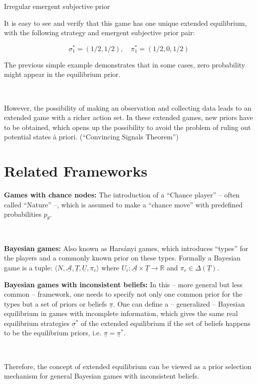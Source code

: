 \documentclass{beamer}
\theoremstyle{definition}
\begin{document}
\begin{frame}{Irregular emergent subjective prior}

    It is easy to see and verify that this game has one unique extended equilibrium, with the following strategy and emergent subjective prior pair:

    \begin{equation}
        \sigma_1^* = (1/2,1/2), \quad \pi_1^* = (1/2, 0, 1/2)
    \end{equation}

    The previous simple example demonstrates that in some cases, zero probability might appear in the equilibrium prior.

    \
    
    However, the possibility of making an observation and collecting data leads to an extended game with a richer action set. In these extended games, new priors have to be obtained, which opens up the possibility to avoid the problem of ruling out potential states à priori. (``Convincing Signals Theorem'')

\end{frame}

\section{Related Frameworks}

\begin{frame}{}

{\bf Games with chance nodes:}
The introduction of a
``Chance player'' -- often called ``Nature'' --, which is assumed to make a ``chance move'' with predefined probabilities $p_\theta$.

\

{\bf Bayesian games:}
Also known as Harsányi games, which introduces ``types'' for the players and a commonly known prior on these types. Formally a Bayesian game is a tuple: $\langle N, \underline{\mathcal{A}}, \underline{T}, \underline{U}, \pi_c \rangle$ where $U_i : \underline{\mathcal{A}} \times \underline{T} \to \mathbb{R}$ and $\pi_c \in \Delta(\underline{T})$.
    
\end{frame}

\begin{frame}{}

{\bf Bayesian games with inconsistent beliefs:}
In this -- more general but less common -- framework, one needs to specify not only one common prior for the types but a set of priors or beliefs $\underline{\pi}$.
One can define a -- generalized -- Bayesian equilibrium in games with incomplete information, which gives the same real equilibrium strategies $\underline{\sigma}^*$ of the extended equilibrium if the set of beliefs happens to be the equilibrium priors, i.e. $\underline{\pi} = \underline{\pi}^*$.

\ 

Therefore, the concept of extended equilibrium can be viewed as a prior selection mechanism for general Bayesian games with inconsistent beliefs.
    
\end{frame}
\end{document}

